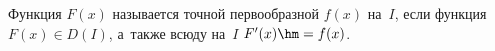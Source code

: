 
  Функция $F(x)$ называется точной первообразной $f(x)$ на~$I$, если функция $F(x)\in D(I)$, а~также всюду на~$I$ $F'(x)\hm=f(x)$.
